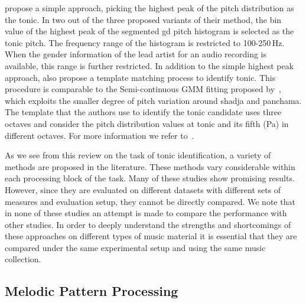 \cite{Ashwin_Istanbul2012} propose a simple approach, picking the highest peak of the pitch distribution as the tonic. In two out of the three proposed variants of their method, the bin value of the highest peak of the segmented \gls{gd} pitch histogram is selected as the tonic pitch. The frequency range of the histogram is restricted to 100-250\,Hz. When the gender information of the lead artist for an audio recording is available, this range is further restricted. In addition to the simple highest peak approach, \cite{Ashwin_Istanbul2012} also propose a template matching process to identify tonic. This procedure is comparable to the Semi-continuous GMM fitting proposed by~\citep{ranjani2011carnatic}, which exploits the smaller degree of pitch variation around \gls{shadja} and \gls{panchama}. The template that the authors use to identify the tonic candidate uses three octaves and consider the pitch distribution values at tonic and its fifth (Pa) in different octaves. For more information we refer to~\cite{Gulati2014Tonic}.


As we see from this review on the task of tonic identification, a variety of methods are proposed in the literature. These methods vary considerable within each processing block of the task. Many of these studies show promising results. However, since they are evaluated on different datasets with different sets of measures and evaluation setup, they cannot be directly compared.  We note that in none of these studies an attempt is made to compare the performance with other studies. In order to deeply understand the strengths and shortcomings of these approaches on different types of music material it is essential that they are compared under the same experimental setup and using the same music collection. 


\subsection{Melodic Pattern Processing}
\label{sec:sota_pattern_processing_iam}


